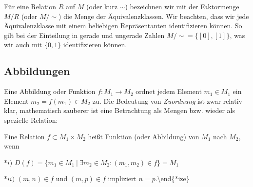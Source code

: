 Für eine Relation \(R\) auf \(M\) (oder kurz \(\sim\)) bezeichnen wir mit der Faktormenge \(M/R\) (oder \(M/\sim\)) die Menge der Äquivalenzklassen. Wir beachten, dass wir jede Äquivalenzklasse mit einem beliebigen Repräsentanten identifizieren können. So gilt bei der Einteilung in gerade und ungerade Zahlen \(M/\sim = \{[0],[1]\}\), was wir auch mit \(\{0,1\}\) identifizieren können.


\subsection{Abbildungen}
\label{\detokenize{grundlagen/mengenlogik:abbildungen}}
Eine Abbildung oder Funktion \(f:M_1 \rightarrow M_2\) ordnet jedem Element \(m_1 \in M_1\) ein Element \(m_2 =f(m_1) \in M_2\) zu.
Die Bedeutung von \emph{Zuordnung} ist zwar relativ klar, mathematisch sauberer  ist eine Betrachtung als Mengen bzw. wieder als spezielle Relation:
\label{grundlagen/mengenlogik:definition-10}
\begin{definition}{}{}



Eine Relation \(f \subset M_1 \times M_2\) heißt Funktion (oder Abbildung) von \(M_1\) nach \(M_2\), wenn

*\(i)\) \(D(f) = \{m_1 \in M_1~|~\exists m_2 \in M_2: (m_1,m_2) \in f \} = M_1 \)

*\(ii)\) \((m,n) \in f\) und \((m,p) \in f\) impliziert \(n=p\).\textbackslash{}end\{*ize\}
\end{definition}

